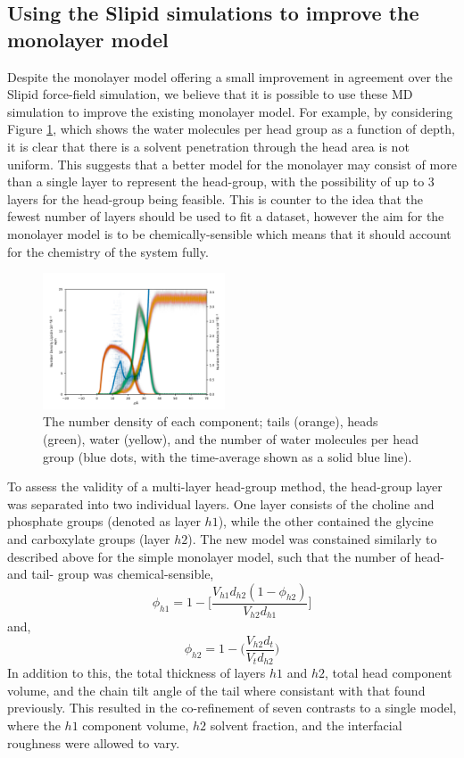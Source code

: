 \documentclass[twoside,twocolumn,9pt]{article}
\begin{document}
\subsection{Using the Slipid simulations to improve the monolayer model}
Despite the monolayer model offering a small improvement in agreement over the Slipid force-field simulation, we believe that it is possible to use these MD simulation to improve the existing monolayer model.
For example, by considering Figure \ref{fig:nb}, which shows the water molecules per head group as a function of depth, it is clear that there is a solvent penetration through the head area is not uniform.
This suggests that a better model for the monolayer may consist of more than a single layer to represent the head-group, with the possibility of up to 3 layers for the head-group being feasible.
This is counter to the idea that the fewest number of layers should be used to fit a dataset, however the aim for the monolayer model is to be chemically-sensible which means that it should account for the chemistry of the system fully.
%
\begin{figure}[h]
\centering
  \includegraphics[width=0.48\textwidth]{figures/number_density}
  \caption{The number density of each component; tails (orange), heads (green), water (yellow), and the number of water molecules per head group (blue dots, with the time-average shown as a solid blue line).}
  \label{fig:nb}
\end{figure}
%

To assess the validity of a multi-layer head-group method, the head-group layer was separated into two individual layers.
One layer consists of the choline and phosphate groups (denoted as layer $h1$), while the other contained the glycine and carboxylate groups (layer $h2$).
The new model was constained similarly to described above for the simple monolayer model, such that the number of head- and tail- group was chemical-sensible,
%
\begin{equation}
  \phi_{h1} = 1 - \Bigg[\frac{V_{h1}d_{h2}(1-\phi_{h2})}{V_{h2}d_{h1}}\Bigg]
\end{equation}
%
and,
%
\begin{equation}
  \phi_{h2} = 1 - \Bigg(\frac{V_{h2}d_{t}}{V_{t}d_{h2}}\Bigg)
\end{equation}
%
In addition to this, the total thickness of layers $h1$ and $h2$, total head component volume, and the chain tilt angle of the tail where consistant with that found previously.
This resulted in the co-refinement of seven contrasts to a single model, where the $h1$ component volume, $h2$ solvent fraction, and the interfacial roughness were allowed to vary.
\end{document}
